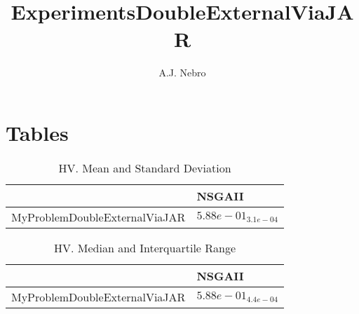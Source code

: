 \documentclass{article}
\title{ExperimentsDoubleExternalViaJAR}
\author{A.J. Nebro}
\begin{document}
\maketitle
\section{Tables}

\begin{table}
\caption{HV. Mean and Standard Deviation}
\label{table: HV}
\centering
\begin{scriptsize}
\begin{tabular}{ll}
\hline &  NSGAII\\
\hline 
MyProblemDoubleExternalViaJAR & \cellcolor{gray95}$  5.88e-01_{ 3.1e-04}$ \\
\hline
\end{tabular}
\end{scriptsize}
\end{table}

\begin{table}
\caption{HV. Median and Interquartile Range}
\label{table: HV}
\centering
\begin{scriptsize}
\begin{tabular}{ll}
\hline &  NSGAII\\
\hline 
MyProblemDoubleExternalViaJAR & \cellcolor{gray95}$  5.88e-01_{ 4.4e-04}$ \\
\hline
\end{tabular}
\end{scriptsize}
\end{table}
\end{document}
